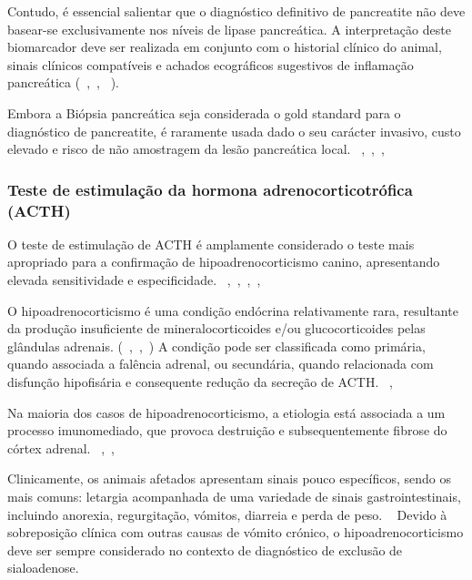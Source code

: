 Contudo, é essencial salientar que o diagnóstico definitivo de pancreatite não deve basear-se exclusivamente nos níveis de lipase pancreática. A interpretação deste biomarcador deve ser realizada em conjunto com o historial clínico do animal, sinais clínicos compatíveis e achados ecográficos sugestivos de inflamação pancreática (~\cite{Cridge2021},~\cite{Kim2024}, ~\cite{Lim2022}).


Embora a Biópsia pancreática seja considerada o gold standard para o diagnóstico de pancreatite, é raramente usada dado o seu carácter invasivo, custo elevado e risco de não amostragem da lesão pancreática local. ~\cite{Cridge2021},~\cite{Kim2024},~\cite{Lim2022}, ~\cite{Liu2025}


\subsubsection{Teste de estimulação da hormona adrenocorticotrófica (ACTH)}


O teste de estimulação de ACTH é amplamente considerado o teste mais apropriado para a confirmação de hipoadrenocorticismo canino, apresentando elevada sensitividade e especificidade. ~\cite{Guzman-Ramos2022},~\cite{Wakayama2017},~\cite{Botsford2018},~\cite{Spence2018},~\cite{Mooney2023}


O hipoadrenocorticismo é uma condição endócrina relativamente rara, resultante da produção insuficiente de mineralocorticoides e/ou glucocorticoides pelas glândulas adrenais. (~\cite{Guzman-Ramos2022},~\cite{Wakayama2017},~\cite{Mooney2023}) A condição pode ser classificada como primária, quando associada a falência adrenal, ou secundária, quando relacionada com disfunção hipofisária e consequente redução da secreção de ACTH. ~\cite{Botsford2018},~\cite{Mooney2023}


Na maioria dos casos de hipoadrenocorticismo, a etiologia está associada a um processo imunomediado, que provoca destruição e subsequentemente fibrose do córtex adrenal. ~\cite{Wakayama2017},~\cite{Spence2018},~\cite{Mooney2023} 


Clinicamente, os animais afetados apresentam sinais pouco específicos, sendo os mais comuns: letargia acompanhada de uma variedade de sinais gastrointestinais, incluindo anorexia, regurgitação, vómitos, diarreia e perda de peso. ~\cite{Guzman-Ramos2022} Devido à sobreposição clínica com outras causas de vómito crónico, o hipoadrenocorticismo deve ser sempre considerado no contexto de diagnóstico de exclusão de sialoadenose.


